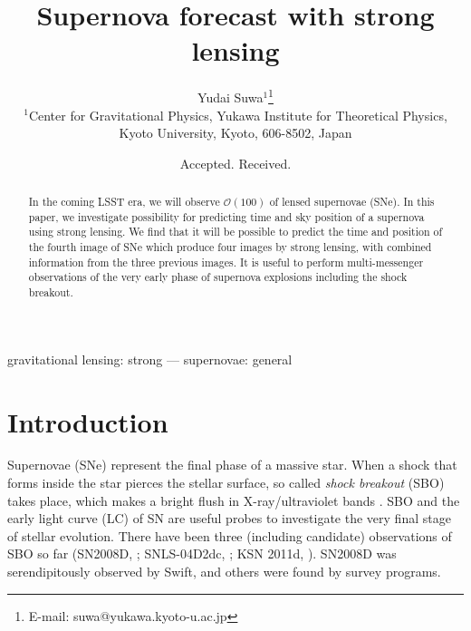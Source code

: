 \documentclass[useAMS,usenatbib,twocolumn]{mnras}
\title[Supernova forecast with strong lensing]
{Supernova forecast with strong lensing}
\author[Y. Suwa]{
Yudai Suwa$^{1}$\thanks{E-mail: suwa@yukawa.kyoto-u.ac.jp}
\\
$^{1}$Center for Gravitational Physics, Yukawa Institute for Theoretical Physics, Kyoto University, Kyoto, 606-8502, Japan
}
\begin{document}
\date{Accepted. Received.}

\pagerange{\pageref{firstpage}--\pageref{lastpage}} 

\maketitle

\label{firstpage}

\begin{abstract}

In the coming LSST era, we will observe $\mathcal{O}(100)$ of lensed
supernovae (SNe). In this paper, we investigate possibility for
predicting time and sky position of a supernova using strong
lensing. We find that it will be possible to predict the time and
position of the fourth image of SNe which produce four images by
strong lensing, with combined information from the three previous
images. It is useful to perform multi-messenger observations of the
very early phase of supernova explosions including the shock breakout.

\end{abstract}

\begin{keywords}
gravitational lensing: strong --- supernovae: general 
\end{keywords}


\section{Introduction}
\label{sec:intro}

Supernovae (SNe) represent the final phase of a massive star. When a
shock that forms inside the star pierces the stellar surface, so
called {\it shock breakout} (SBO) takes place, which makes a bright
flush in X-ray/ultraviolet bands \citep[see][for a recent
  review]{waxm16}. SBO and the early light curve (LC) of SN are useful
probes to investigate the very final stage of stellar evolution. There
have been three (including candidate) observations of SBO so far
(SN2008D, \citealt{sode08b}; SNLS-04D2dc, \citealt{scha08}; KSN 2011d,
\citealt{garn16}). SN2008D was serendipitously observed by Swift, and
others were found by survey programs.
\end{document}
